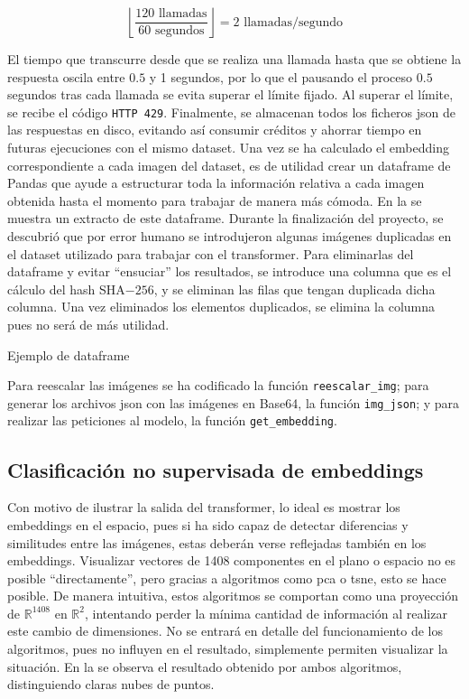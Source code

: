 				$$
				\left\lfloor\frac{120\text{ llamadas}}{60\text{ segundos}}\right\rfloor = 2 \text{ llamadas/segundo}
				$$
				
				El tiempo que transcurre desde que se realiza una llamada hasta que se obtiene la respuesta oscila entre $0.5$ y 1 segundos, por lo que el pausando el proceso $0.5$ segundos tras cada llamada se evita superar el límite fijado. Al superar el límite, se recibe el código \texttt{HTTP 429}. Finalmente, se almacenan todos los ficheros \gls{json} de las respuestas en disco, evitando así consumir  créditos y ahorrar tiempo en futuras ejecuciones con el mismo dataset. Una vez se ha calculado el embedding correspondiente a cada imagen del dataset, es de utilidad crear un dataframe de Pandas que ayude a estructurar toda la información relativa a cada imagen obtenida hasta el momento para trabajar de manera más cómoda. En la  se muestra un extracto de este dataframe. Durante la finalización del proyecto, se descubrió que por error humano se introdujeron algunas imágenes duplicadas en el dataset utilizado para trabajar con el transformer. Para eliminarlas del dataframe y evitar ``ensuciar'' los resultados, se introduce una columna que es el cálculo del hash SHA$-256$, y se eliminan las filas que tengan duplicada dicha columna. Una vez eliminados los elementos duplicados, se elimina la columna pues no será de más utilidad. 
				
				\begin{table}[!h]
					\scriptsize
					\centering
					\texttt{}
					\caption{Ejemplo de dataframe}
					\label{tab:df_ejemplo}
				\end{table}
				
				Para reescalar las imágenes se ha codificado la función \texttt{reescalar\_img}; para generar los archivos \gls{json} con las imágenes en Base64, la función \texttt{img\_json}; y para realizar las peticiones al modelo, la función \texttt{get\_embedding}. 
				
			\subsection{Clasificación no supervisada de embeddings}
				
				Con motivo de ilustrar la salida del transformer, lo ideal es mostrar los embeddings en el espacio, pues si ha sido capaz de detectar diferencias y similitudes entre las imágenes, estas deberán verse reflejadas también en los embeddings. Visualizar vectores de 1408 componentes en el plano o espacio no es posible ``directamente'', pero gracias a algoritmos como \gls{pca} o \gls{tsne}, esto se hace posible. De manera intuitiva, estos algoritmos se comportan como una proyección de $\mathbb{R}^{1408}$ en $\mathbb{R}^2$, intentando perder la mínima cantidad de información al realizar este cambio de dimensiones. No se entrará en detalle del funcionamiento de los algoritmos, pues no influyen en el resultado, simplemente permiten visualizar la situación. En la  se observa el resultado obtenido por ambos algoritmos, distinguiendo claras nubes de puntos. 
				
